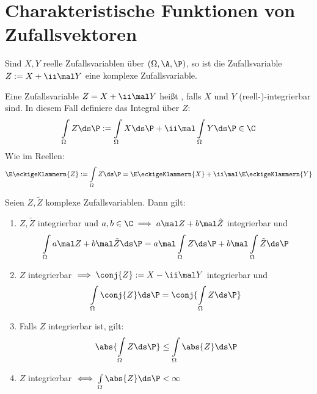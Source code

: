 
\section{Charakteristische Funktionen von Zufallsvektoren}

Sind $X,Y$ reelle Zufallsvariablen über $(\Omega,\A,\P)$, so ist die Zufallsvariable $Z:=X+\ii\mal Y$ eine komplexe Zufallsvariable.

\begin{definition}\label{def4.1}
	Eine Zufallsvariable $Z=X+\ii\mal Y$ heißt , falls $X$ und $Y$ (reell-)-integrierbar sind.
	In diesem Fall definiere das Integral über $Z$:
	\begin{align*}
		\int\limits_\Omega Z\ds\P
		:=\int\limits_\Omega X\ds\P+\ii\mal\int\limits_\Omega Y\ds\P\in\C
	\end{align*}
	Wie im Reellen:
	\begin{align*}
		\E\eckigeKlammern{Z}:=\int\limits_\Omega Z\ds\P=\E\eckigeKlammern{X}+\ii\mal\E\eckigeKlammern{Y}
	\end{align*}
\end{definition}

\begin{satz}\label{satz4.2}
	Seien $Z,\tilde{Z}$ komplexe Zufallsvariablen.
	Dann gilt:
	\begin{enumerate}[label=(\arabic*)]
		\item $Z,\tilde{Z}$ integrierbar und $a,b\in\C\implies a\mal Z+b\mal\tilde{Z}$ integrierbar und 
		\begin{align*}
			\int\limits_\Omega a\mal Z+b\mal\tilde{Z}\ds\P
			=a\mal\int\limits_\Omega Z\ds\P+b\mal\int\limits_\Omega\tilde{Z}\ds\P
		\end{align*}
		\label{item:satz4.2_1}
		\item $Z$ integrierbar $\implies \conj{Z}:=X-\ii\mal Y$ integrierbar und
		\begin{align*}
			\int\limits_\Omega\conj{Z}\ds\P=\conj{\int\limits_\Omega Z\ds\P}
		\end{align*}
		\label{item:satz4.2_2}
		\item Falls $Z$ integrierbar ist, gilt:
		\begin{align*}
			\abs{\int\limits_\Omega Z\ds\P}\leq\int\limits_\Omega\abs{Z}\ds\P
		\end{align*}
		\label{item:satz4.2_3}
		\item $Z$ integrierbar $\iff\int\limits_\Omega\abs{Z}\ds\P<\infty$
		\label{item:satz4.2_4}
	\end{enumerate}
\end{satz}

